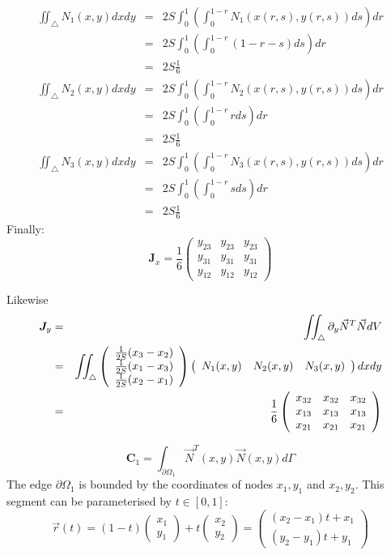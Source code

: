 \begin{eqnarray}
\iint_\triangle N_1(x,y) dx dy 
&=& 2S \int_0^{1} \left(\int_0^{1-r} N_1(x(r,s),y(r,s))  ds \right) dr \\ 
&=& 2S \int_0^{1} \left(\int_0^{1-r} (1-r-s)  ds \right) dr \\ 
&=& 2S \frac{1}{6} \\ 
\iint_\triangle N_2(x,y) dx dy 
&=& 2S \int_0^{1} \left(\int_0^{1-r} N_2(x(r,s),y(r,s))  ds \right) dr \\ 
&=& 2S \int_0^{1} \left(\int_0^{1-r} r  ds \right) dr \\ 
&=& 2S \frac{1}{6} \\ 
\iint_\triangle N_3(x,y) dx dy 
&=& 2S \int_0^{1} \left(\int_0^{1-r} N_3(x(r,s),y(r,s))  ds \right) dr \\ 
&=& 2S \int_0^{1} \left(\int_0^{1-r} s  ds \right) dr \\ 
&=& 2S \frac{1}{6} 
\end{eqnarray}
Finally:
\[
{\bm J}_x
=
\frac{1}{6}
\left(
\begin{array}{ccc}
y_{23} & y_{23} & y_{23} \\ 
y_{31} & y_{31} & y_{31} \\ 
y_{12} & y_{12} & y_{12}  
\end{array}
\right) 
\]

Likewise
\begin{eqnarray}
{\bm J}_y
&=& \iint_\triangle  \partial_y \vec{N}^T \vec{N} dV \nonumber\\
&=&  \iint_\triangle 
\left(
\begin{array}{c}
\frac{1}{2S}(x_3-x_2) \\
\frac{1}{2S}(x_1-x_3) \\
\frac{1}{2S}(x_2-x_1)
\end{array}
\right)
\left(
\begin{array}{ccc}
N_1(x,y) & N_2(x,y) & N_3(x,y) 
\end{array}
\right) dx dy \nonumber\\
&=&
\frac{1}{6}
\left(
\begin{array}{ccc}
x_{32} & x_{32} & x_{32} \\ 
x_{13} & x_{13} & x_{13} \\ 
x_{21} & x_{21} & x_{21}  
\end{array}
\right) 
\end{eqnarray}


\newpage
\[
{\bm C}_1
=\int_{\partial\Omega_1} \vec{N}^T(x,y) \vec{N}(x,y) d\Gamma
\]
The edge $\partial\Omega_1$ is bounded by the coordinates of nodes $x_1,y_1$
and $x_2,y_2$. This segment can be parameterised by $t\in[0,1]$:
\[
\vec{r}(t) = (1-t)\left(\begin{array}{c} x_1 \\ y_1 \end{array} \right) + 
t \left(\begin{array}{c} x_2 \\ y_2 \end{array} \right)
=
\left(\begin{array}{c} (x_2-x_1)t +x_1 \\ (y_2-y_1)t+y_1 \end{array} \right) 
\]

